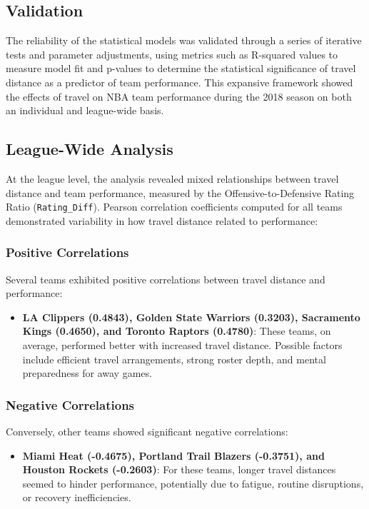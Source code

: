 \documentclass[12pt]{article}
\begin{document}
\clearpage
\subsection{Validation}
The reliability of the statistical models was validated through a series of iterative tests and parameter adjustments, using metrics such as R-squared values to measure model fit and p-values to determine the statistical significance of travel distance as a predictor of team performance. This expansive framework showed the effects of travel on NBA team performance during the 2018 season on both an individual and league-wide basis.

\subsection{League-Wide Analysis}
At the league level, the analysis revealed mixed relationships between travel distance and team performance, measured by the Offensive-to-Defensive Rating Ratio (\texttt{Rating\_Diff}). Pearson correlation coefficients computed for all teams demonstrated variability in how travel distance related to performance:

\subsubsection*{Positive Correlations}
Several teams exhibited positive correlations between travel distance and performance:
\begin{itemize}
    \item \textbf{LA Clippers (0.4843), Golden State Warriors (0.3203), Sacramento Kings (0.4650), and Toronto Raptors (0.4780)}: These teams, on average, performed better with increased travel distance. Possible factors include efficient travel arrangements, strong roster depth, and mental preparedness for away games.
\end{itemize}

\subsubsection*{Negative Correlations}
Conversely, other teams showed significant negative correlations:
\begin{itemize}
    \item \textbf{Miami Heat (-0.4675), Portland Trail Blazers (-0.3751), and Houston Rockets (-0.2603)}: For these teams, longer travel distances seemed to hinder performance, potentially due to fatigue, routine disruptions, or recovery inefficiencies.
\end{itemize}
\end{document}

